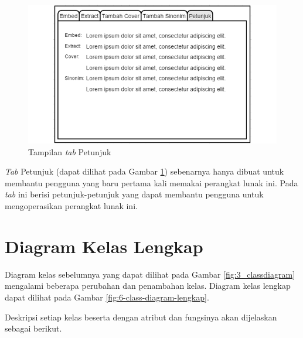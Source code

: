 \begin{figure}[H]
	\centering
	\includegraphics[scale=1.8]{Gambar/tab-petunjuk}
	\caption{Tampilan \textit{tab} Petunjuk} 
	\label{fig:5-tab-petunjuk}
\end{figure}

\textit{Tab} Petunjuk (dapat dilihat pada Gambar \ref{fig:5-tab-petunjuk}) sebenarnya hanya dibuat untuk membantu pengguna yang baru pertama kali memakai perangkat lunak ini. Pada \textit{tab} ini berisi petunjuk-petunjuk yang dapat membantu pengguna untuk mengoperasikan perangkat lunak ini.

\section{Diagram Kelas Lengkap}

Diagram kelas sebelumnya yang dapat dilihat pada Gambar \ref{fig:3_classdiagram} mengalami beberapa perubahan dan penambahan kelas. Diagram kelas lengkap dapat dilihat pada Gambar \ref{fig:6-class-diagram-lengkap}.

Deskripsi setiap kelas beserta dengan atribut dan fungsinya akan dijelaskan sebagai berikut.

